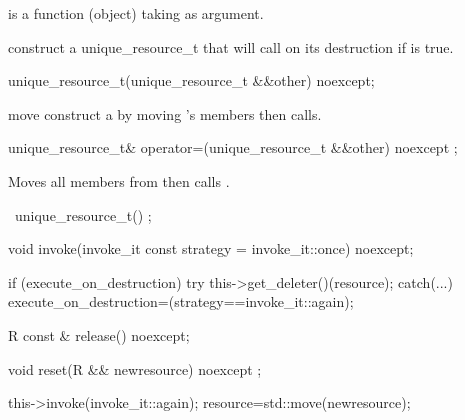 \documentclass[ebook,11pt,article]{memoir}
\begin{document}
\pnum
\requires {} is a function (object) taking  as argument.

\pnum
\effects construct a unique_resource_t that will call  on its destruction if  is true.

\begin{itemdecl}
unique_resource_t(unique_resource_t &&other) noexcept;
\end{itemdecl}

\pnum
\effects move construct a  by moving 's members then calls.

\begin{itemdecl}
unique_resource_t& operator=(unique_resource_t  &&other) noexcept ;
\end{itemdecl}

\pnum
\effects {} Moves all members from  then calls .

\begin{itemdecl}
~unique_resource_t() ;
\end{itemdecl}

\pnum
\effects {}

\begin{itemdecl}
void invoke(invoke_it const strategy = invoke_it::once) noexcept;
\end{itemdecl}

\pnum
\effects 
\begin{codeblock}
if (execute_on_destruction) try {
	this->get_deleter()(resource);
} catch(...){}
execute_on_destruction=(strategy==invoke_it::again);
\end{codeblock}

\begin{itemdecl}
R const & release() noexcept;
\end{itemdecl}

\pnum
\effects {}

\pnum
\returns {}

\begin{itemdecl}
void reset(R && newresource) noexcept ;
\end{itemdecl}

\pnum
\effects 
\begin{codeblock}
this->invoke(invoke_it::again); 
resource=std::move(newresource);
\end{codeblock}
\end{document}
